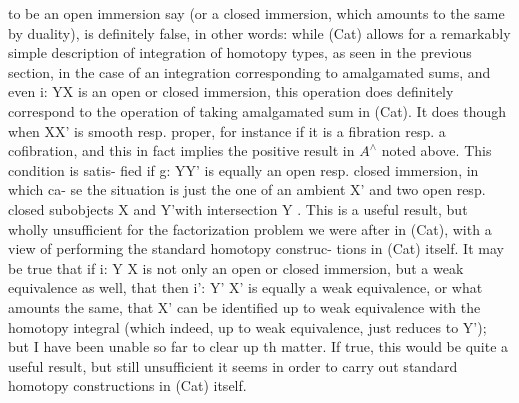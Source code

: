 
to be an open immersion say (or a closed immersion,  which amounts to the
same by duality),  is definitely false,  in other words:  while (Cat)
allows for a remarkably simple description of integration of homotopy
types,  as seen in the previous section,  in the case of an integration
\hand{$\int$} \hand{(}corresponding to amalgamated sums\hand{)}, and even  i: Y\hand{$\rightarrow$}X is an
open or closed immersion,  this operation does definitely \hand{\uline{\textcolor{black}{not}}} correspond
to the operation of taking amalgamated sum in (Cat).  It does though 
when X\hand{$\rightarrow$}X' is smooth resp. proper,  for instance if it is a fibration
resp. a cofibration,  and this in fact implies the positive result in $A^{\wedge}$
noted above.    This condition is satis-%
fied if g: Y\hand{$\rightarrow$}Y' is equally an open resp. closed immersion,  in which ca-%
se the situation is just the  one of an ambient X'\hand{,} and two open
resp. closed subobjects X and Y'\hand{,}with intersection Y .  This is a useful
result,  but wholly unsufficient for the factorization problem we were
after in (Cat),  with a view of performing the standard homotopy construc-%
tions in (Cat) itself.  It may be true that if i: Y\hand{$\rightarrow$} X is not only an
open or closed immersion,  but a weak equivalence as well,  that then
i': Y' \hand{$\rightarrow$}X' is equally a weak equivalence,  or what amounts the same,  that
X' can be identified up to weak equivalence with the homotopy integral
(which indeed,  up to weak equivalence,  just reduces to Y');  but I have
been unable so far to clear up th matter.  If true,  this would be quite
a useful result,  but still unsufficient it seems in order to carry out 
standard homotopy constructions in (Cat) itself.

